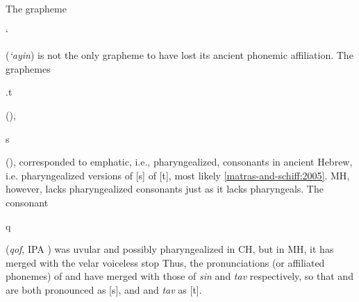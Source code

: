 	
The grapheme \begin{cjhebrew}`\end{cjhebrew} (\textit{`ayin}) is not the only 
grapheme to have 
lost its ancient phonemic affiliation. 
The graphemes \begin{cjhebrew}.t\end{cjhebrew} 
(\textit{}), \begin{cjhebrew}s\end{cjhebrew} 
(\textit{}), corresponded to emphatic, i.e., pharyngealized, consonants in ancient Hebrew, i.e. pharyngealized versions of [s] of [t], most likely \ref{matras-and-schiff:2005}.
\ac{MH}, however, lacks pharyngealized consonants just as it lacks pharyngeals. 
The consonant \begin{cjhebrew}q\end{cjhebrew} (\textit{qof}, IPA \textipa{[q]}) was uvular and 
possibly pharyngealized in \ac{CH}, but in \ac{MH}, it has merged with the velar voiceless stop
 Thus, the pronunciations (or affiliated phonemes) of \textit{} and \textit{} have merged with those of \textit{sin} and \textit{tav} respectively, so that \textit{} and \textit{} are both pronounced as [s], and \textit{} and \textit{tav} as [t].
%

